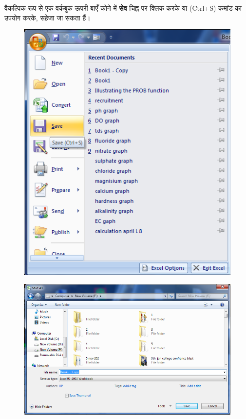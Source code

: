 वैकल्पिक रूप से एक वर्कबुक ऊपरी बाएँ कोने में \textbf{सेव} चिह्न पर क्लिक करके या ({\eng Ctrl+S}) कमांड का उपयोग करके, सहेजा जा सकता हैं।

\begin{figure}[H]
\centering
\includegraphics[scale=0.33]{src/images/chapter1/chapter1_fig24.png}
\end{figure}
\begin{figure}[H]
\centering
\includegraphics[scale=0.3]{src/images/chapter1/chapter1_fig25.png}
\end{figure}

